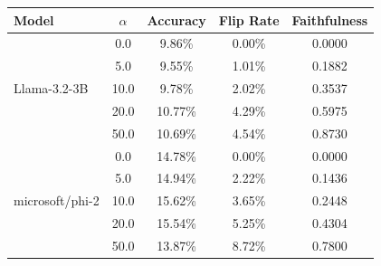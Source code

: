 \documentclass[preview, border=5mm]{standalone}
\begin{document}
\begin{minipage}{14cm}
    \centering
    \vspace{0.2cm}
    \begin{tabular}{l c c c c}
        \toprule
        \textbf{Model} & \textbf{$\alpha$} & \textbf{Accuracy} & \textbf{Flip Rate} & \textbf{Faithfulness} \\
        \midrule
        \multirow{5}{*}{Llama-3.2-3B} 
        & 0.0 & 9.86\% & 0.00\% & 0.0000 \\
        & 5.0 & 9.55\% & 1.01\% & 0.1882 \\
        & 10.0 & 9.78\% & 2.02\% & 0.3537 \\
        & 20.0 & 10.77\% & 4.29\% & 0.5975 \\
        & 50.0 & 10.69\% & 4.54\% & 0.8730 \\
        \midrule
        \multirow{5}{*}{microsoft/phi-2} 
        & 0.0 & 14.78\% & 0.00\% & 0.0000 \\
        & 5.0 & 14.94\% & 2.22\% & 0.1436 \\
        & 10.0 & 15.62\% & 3.65\% & 0.2448 \\
        & 20.0 & 15.54\% & 5.25\% & 0.4304 \\
        & 50.0 & 13.87\% & 8.72\% & 0.7800 \\
        \bottomrule
    \end{tabular}
\end{minipage}
\end{document}
